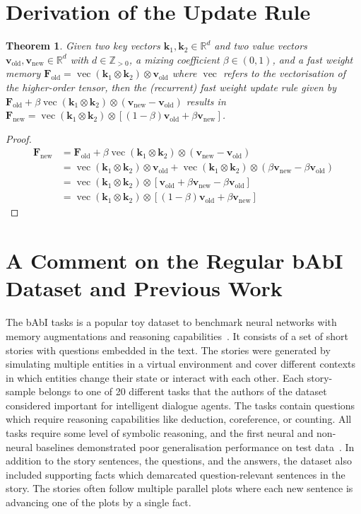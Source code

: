 \documentclass{article} \usepackage{iclr2021_conference,times}
\def\vk{{\bm{k}}}
\def\vv{{\bm{v}}}
\def\mF{{\bm{F}}}
\DeclareMathOperator{\vect}{vec}
\begin{document}
\section{Derivation of the Update Rule}
\label{appendix:sec:updateRule}
\newtheorem{theorem}{Theorem}[section]
\begin{theorem}
Given two key vectors $\vk_1, \vk_2 \in \mathbb{R}^d$ and two value vectors $\vv_\text{old}, \vv_\text{new} \in \mathbb{R}^d$ with $d \in \mathbb Z_{> 0}$, a mixing coefficient $\beta \in (0,1)$, and a fast weight memory $\mF_\text{old} = \vect(\vk_1 \otimes \vk_2) \otimes \vv_\text{old}$ where $\vect$ refers to the vectorisation of the higher-order tensor, then the (recurrent) fast weight update rule given by $\mF_\text{old} + \beta \vect(\vk_1 \otimes \vk_2) \otimes (\vv_\text{new} - \vv_\text{old})$ results in $\mF_\text{new} = \vect(\vk_1 \otimes \vk_2) \otimes [(1-\beta) \vv_\text{old} + \beta \vv_\text{new}]$.
\end{theorem}

\begin{proof}
\begin{align}
  \mF_\text{new} &= \mF_\text{old} + \beta \vect(\vk_1 \otimes \vk_2) \otimes (\vv_\text{new} - \vv_\text{old}) \\
  &= \vect(\vk_1 \otimes \vk_2) \otimes \vv_\text{old} + \vect(\vk_1 \otimes \vk_2) \otimes (\beta \vv_\text{new} - \beta \vv_\text{old}) \\
  &= \vect(\vk_1 \otimes \vk_2) \otimes [\vv_\text{old} + \beta \vv_\text{new} - \beta \vv_\text{old}] \\
  &= \vect(\vk_1 \otimes \vk_2) \otimes [(1-\beta)\vv_\text{old} + \beta \vv_\text{new}]
\end{align}
\end{proof}


\section{A Comment on the Regular bAbI Dataset and Previous Work}
The bAbI tasks is a popular toy dataset to benchmark neural networks with memory augmentations and reasoning capabilities~\citep{babi_tasks_weston}. 
It consists of a set of short stories with questions embedded in the text. 
The stories were generated by simulating multiple entities in a virtual environment and cover different contexts in which entities change their state or interact with each other.
Each story-sample belongs to one of 20 different tasks that the authors of the dataset considered important for intelligent dialogue agents. 
The tasks contain questions which require reasoning capabilities like deduction, coreference, or counting.
All tasks require some level of symbolic reasoning, and the first neural and non-neural baselines demonstrated poor generalisation performance on test data~\citep{babi_tasks_weston}.
In addition to the story sentences, the questions, and the answers, the dataset also included supporting facts which demarcated question-relevant sentences in the story. 
The stories often follow multiple parallel plots where each new sentence is advancing one of the plots by a single fact. 
\end{document}
